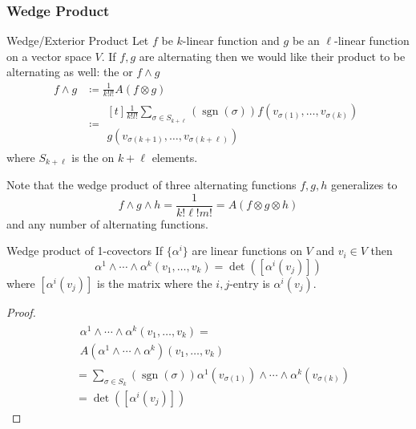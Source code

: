 \subsubsection{Wedge Product}

\begin{definition}{Wedge/Exterior Product}{}
    Let \(f\) be \(k\)-linear function and \(g\) be an \(\ell\)-linear function on a vector space \(V\).
    If  \(f,g\) are alternating then we would like their product to be alternating as well: the  or  \(f \wedge g\)
    \begin{align}
        f \wedge g & \coloneqq \frac{1}{k!l!}  A(f \otimes g) \\
                   & \coloneqq
        \begin{multlined}[t]
            \frac{1}{k!l!}  \sum_{\sigma \in S_{k+\ell}} (\operatorname{sgn}(\sigma)) f(v_{\sigma(1)}, \dots, v_{\sigma(k)}) \\
            g(v_{\sigma(k+1)}, \dots, v_{\sigma(k+\ell)})
        \end{multlined}
    \end{align}
    where \(S_{k+\ell}\) is the  on \(k+\ell\) elements.
\end{definition}

Note that the wedge product of three alternating functions \(f,g,h\) generalizes to
\begin{equation}
    f \wedge g \wedge h = \frac{1}{k!\ell!m!} = A(f\otimes g \otimes h)
\end{equation}
and any number of alternating functions.

\begin{proposition}{Wedge product of 1-covectors}{}
    If \(\{\alpha^i\}\) are linear functions on \(V\) and \(v_i \in V\) then
    \begin{equation}
        \alpha^1 \wedge \cdots \wedge \alpha^k (v_1, \dots, v_k) = \det([\alpha^i(v_j)])
    \end{equation}
    where \([\alpha^i(v_j)]\) is the matrix where the \(i,j\)-entry is \(\alpha^i(v_j)\).
\end{proposition}

\begin{proof}
    \begin{align}
         & \begin{multlined}
            \alpha^1 \wedge \cdots \wedge \alpha^k (v_1, \dots, v_k) = \\
            A(\alpha^1 \wedge \cdots \wedge \alpha^k) (v_1, \dots, v_k)
        \end{multlined}                                                                                                  \\
         & = \sum_{\sigma \in S_k} (\operatorname{sgn}(\sigma)) \alpha^1 (v_{\sigma(1)}) \wedge \cdots \wedge \alpha^k (v_{\sigma(k)}) \\
         & = \det([\alpha^i(v_j)])
    \end{align}
\end{proof}

